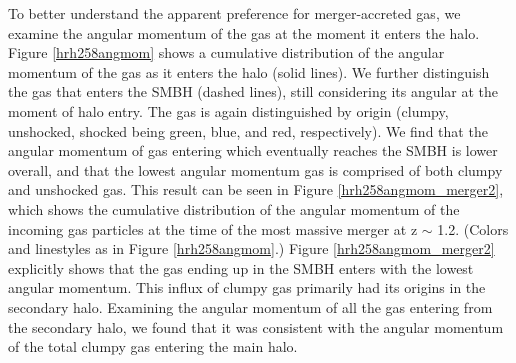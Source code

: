\documentclass[]{emulateapj}
\begin{document}
To better understand the apparent preference for merger-accreted gas, we examine the angular momentum of the gas at the moment it enters the halo. Figure \ref{hrh258angmom} shows a cumulative distribution of the angular momentum of the gas as it enters the halo (solid lines). We further distinguish the gas that enters the SMBH (dashed lines), still considering its angular at the moment of halo entry. The gas is again distinguished by origin (clumpy, unshocked, shocked being green, blue, and red, respectively). We find that the angular momentum of gas entering which eventually reaches the SMBH is lower overall, and that the lowest angular momentum gas is comprised of both clumpy and unshocked gas. This result can be seen in Figure \ref{hrh258angmom_merger2}, which shows the cumulative distribution of the angular momentum of the incoming gas particles at the time of the most massive merger at z $\sim$ 1.2. (Colors and linestyles as in Figure \ref{hrh258angmom}.) Figure \ref{hrh258angmom_merger2} explicitly shows that the gas ending up in the SMBH enters with the lowest angular momentum. This influx of clumpy gas primarily had its origins in the secondary halo. Examining the angular momentum of all the gas entering from the secondary halo, we found that it was consistent with the angular momentum of the total clumpy gas entering the main halo. 

\end{document}
